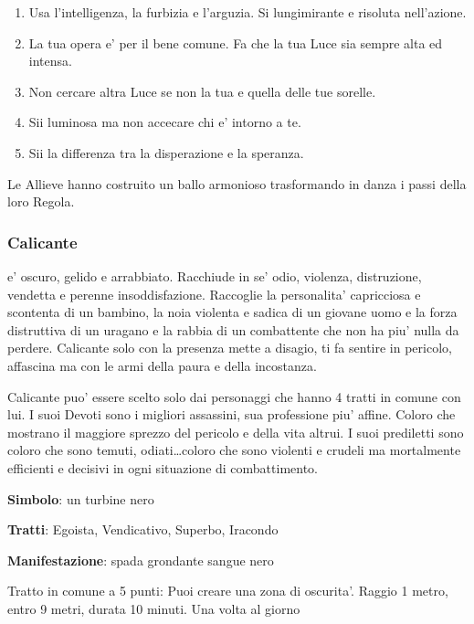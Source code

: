 \documentclass[a4paper,11pt,twoside,openany]{book}
\begin{document}
{\begin{enumerate}
			\item Usa l'intelligenza, la furbizia e l'arguzia. Si lungimirante e risoluta nell'azione.
			
			\item La tua opera e' per il bene comune. Fa che la tua Luce sia sempre alta ed intensa.
			
			\item Non cercare altra Luce se non la tua e quella delle tue sorelle.
			
			\item Sii luminosa ma non accecare chi e' intorno a te.
			
			\item Sii la differenza tra la disperazione e la speranza.
		\end{enumerate}
		
		Le Allieve hanno costruito un ballo armonioso trasformando in danza i passi della loro Regola.
		
		\subsubsection{Calicante}
		
		\label{calicante}
		
		e' oscuro, gelido e arrabbiato. Racchiude in se' odio, violenza, distruzione, vendetta e perenne insoddisfazione. Raccoglie la personalita' capricciosa e scontenta di un bambino, la noia violenta e sadica di un giovane uomo e la forza distruttiva di un uragano e la rabbia di un combattente che non ha piu' nulla da perdere. Calicante solo con la presenza mette a disagio, ti fa sentire in pericolo, affascina ma con le armi della paura e della incostanza.
		
		Calicante puo' essere scelto solo dai personaggi che hanno 4 tratti in comune con lui. I suoi Devoti sono i migliori assassini, sua professione piu' affine. Coloro che mostrano il maggiore sprezzo del pericolo e della vita altrui. I suoi prediletti sono coloro che sono temuti, odiati\ldots coloro che sono violenti e crudeli ma mortalmente efficienti e decisivi in ogni situazione di combattimento.
		
		\textbf{Simbolo}: un turbine nero
		
		\textbf{Tratti}: Egoista, Vendicativo, Superbo, Iracondo
		
		\textbf{Manifestazione}: spada grondante sangue nero
		
		\bigskip
		
		Tratto in comune a 5 punti: Puoi creare una zona di oscurita'. Raggio 1 metro, entro 9 metri, durata 10 minuti. Una volta al giorno
		
}
\end{document}
